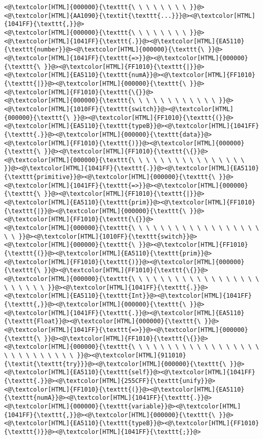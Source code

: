 \begin{lstlisting}
<@\textcolor[HTML]{000000}{\texttt{\ \ \ \ \ \ \ \ }}@><@\textcolor[HTML]{AA1090}{\textit{\texttt{...}}}@><@\textcolor[HTML]{1041FF}{\texttt{,}}@>
<@\textcolor[HTML]{000000}{\texttt{\ \ \ \ \ \ \ \ }}@><@\textcolor[HTML]{1041FF}{\texttt{.}}@><@\textcolor[HTML]{EA5110}{\texttt{number}}@><@\textcolor[HTML]{000000}{\texttt{\ }}@><@\textcolor[HTML]{1041FF}{\texttt{=>}}@><@\textcolor[HTML]{000000}{\texttt{\ }}@><@\textcolor[HTML]{FF1010}{\texttt{|}}@><@\textcolor[HTML]{EA5110}{\texttt{numA}}@><@\textcolor[HTML]{FF1010}{\texttt{|}}@><@\textcolor[HTML]{000000}{\texttt{\ }}@><@\textcolor[HTML]{FF1010}{\texttt{\{}}@>
<@\textcolor[HTML]{000000}{\texttt{\ \ \ \ \ \ \ \ \ \ \ \ }}@><@\textcolor[HTML]{1010FF}{\texttt{switch}}@><@\textcolor[HTML]{000000}{\texttt{\ }}@><@\textcolor[HTML]{FF1010}{\texttt{(}}@><@\textcolor[HTML]{EA5110}{\texttt{typeB}}@><@\textcolor[HTML]{1041FF}{\texttt{.}}@><@\textcolor[HTML]{000000}{\texttt{data}}@><@\textcolor[HTML]{FF1010}{\texttt{)}}@><@\textcolor[HTML]{000000}{\texttt{\ }}@><@\textcolor[HTML]{FF1010}{\texttt{\{}}@>
<@\textcolor[HTML]{000000}{\texttt{\ \ \ \ \ \ \ \ \ \ \ \ \ \ \ \ }}@><@\textcolor[HTML]{1041FF}{\texttt{.}}@><@\textcolor[HTML]{EA5110}{\texttt{primitive}}@><@\textcolor[HTML]{000000}{\texttt{\ }}@><@\textcolor[HTML]{1041FF}{\texttt{=>}}@><@\textcolor[HTML]{000000}{\texttt{\ }}@><@\textcolor[HTML]{FF1010}{\texttt{|}}@><@\textcolor[HTML]{EA5110}{\texttt{prim}}@><@\textcolor[HTML]{FF1010}{\texttt{|}}@><@\textcolor[HTML]{000000}{\texttt{\ }}@><@\textcolor[HTML]{FF1010}{\texttt{\{}}@>
<@\textcolor[HTML]{000000}{\texttt{\ \ \ \ \ \ \ \ \ \ \ \ \ \ \ \ \ \ \ \ }}@><@\textcolor[HTML]{1010FF}{\texttt{switch}}@><@\textcolor[HTML]{000000}{\texttt{\ }}@><@\textcolor[HTML]{FF1010}{\texttt{(}}@><@\textcolor[HTML]{EA5110}{\texttt{prim}}@><@\textcolor[HTML]{FF1010}{\texttt{)}}@><@\textcolor[HTML]{000000}{\texttt{\ }}@><@\textcolor[HTML]{FF1010}{\texttt{\{}}@>
<@\textcolor[HTML]{000000}{\texttt{\ \ \ \ \ \ \ \ \ \ \ \ \ \ \ \ \ \ \ \ \ \ \ \ }}@><@\textcolor[HTML]{1041FF}{\texttt{.}}@><@\textcolor[HTML]{EA5110}{\texttt{Int}}@><@\textcolor[HTML]{1041FF}{\texttt{,}}@><@\textcolor[HTML]{000000}{\texttt{\ }}@><@\textcolor[HTML]{1041FF}{\texttt{.}}@><@\textcolor[HTML]{EA5110}{\texttt{Float}}@><@\textcolor[HTML]{000000}{\texttt{\ }}@><@\textcolor[HTML]{1041FF}{\texttt{=>}}@><@\textcolor[HTML]{000000}{\texttt{\ }}@><@\textcolor[HTML]{FF1010}{\texttt{\{}}@>
<@\textcolor[HTML]{000000}{\texttt{\ \ \ \ \ \ \ \ \ \ \ \ \ \ \ \ \ \ \ \ \ \ \ \ \ \ \ \ }}@><@\textcolor[HTML]{911010}{\textit{\texttt{try}}}@><@\textcolor[HTML]{000000}{\texttt{\ }}@><@\textcolor[HTML]{EA5110}{\texttt{self}}@><@\textcolor[HTML]{1041FF}{\texttt{.}}@><@\textcolor[HTML]{255CFF}{\texttt{unify}}@><@\textcolor[HTML]{FF1010}{\texttt{(}}@><@\textcolor[HTML]{EA5110}{\texttt{numA}}@><@\textcolor[HTML]{1041FF}{\texttt{.}}@><@\textcolor[HTML]{000000}{\texttt{variable}}@><@\textcolor[HTML]{1041FF}{\texttt{,}}@><@\textcolor[HTML]{000000}{\texttt{\ }}@><@\textcolor[HTML]{EA5110}{\texttt{typeB}}@><@\textcolor[HTML]{FF1010}{\texttt{)}}@><@\textcolor[HTML]{1041FF}{\texttt{;}}@>

\end{lstlisting}

